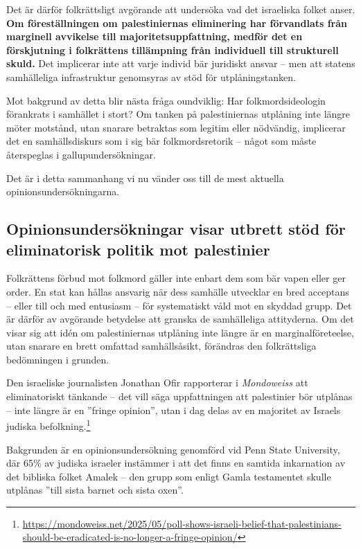 \documentclass[12pt]{article}
\begin{document}
Det är därför folkrättsligt avgörande att undersöka vad det israeliska folket anser. 
\textbf{Om föreställningen om palestiniernas eliminering har förvandlats från marginell avvikelse till majoritetsuppfattning, medför det en förskjutning i folkrättens tillämpning från individuell till strukturell skuld.} 
Det implicerar inte att varje individ bär juridiskt ansvar – men att statens samhälleliga infrastruktur genomsyras av stöd för utplåningstanken.


Mot bakgrund av detta blir nästa fråga oundviklig: Har folkmordsideologin förankrats i samhället i stort? Om tanken på palestiniernas utplåning inte längre möter motstånd, utan snarare betraktas som legitim eller nödvändig, implicerar det en samhällsdiskurs som i sig bär folkmordsretorik – något som måste återspeglas i gallupundersökningar.


Det är i detta sammanhang vi nu vänder oss till de mest aktuella opinionsundersökningarna.


\subsection{Opinionsundersökningar visar utbrett stöd för eliminatorisk politik mot palestinier}

Folkrättens förbud mot folkmord gäller inte enbart dem som bär vapen eller ger order. En stat kan hållas ansvarig när dess samhälle utvecklar en bred acceptans – eller till och med entusiasm – för systematiskt våld mot en skyddad grupp. Det är därför av avgörande betydelse att granska de samhälleliga attityderna. Om det visar sig att idén om palestiniernas utplåning inte längre är en marginalföreteelse, utan snarare en brett omfattad samhällsåsikt, förändras den folkrättsliga bedömningen i grunden.

Den israeliske journalisten Jonathan Ofir rapporterar i \textit{Mondoweiss} att eliminatoriskt tänkande – det vill säga uppfattningen att palestinier bör utplånas – inte längre är en ”fringe opinion”, utan i dag delas av en majoritet av Israels judiska befolkning.\footnote{\url{https://mondoweiss.net/2025/05/poll-shows-israeli-belief-that-palestinians-should-be-eradicated-is-no-longer-a-fringe-opinion/}}

Bakgrunden är en opinionsundersökning genomförd vid Penn State University, där 65\% av judiska israeler instämmer i att det finns en samtida inkarnation av det bibliska folket Amalek – den grupp som enligt Gamla testamentet skulle utplånas ”till sista barnet och sista oxen”. 
\end{document}
